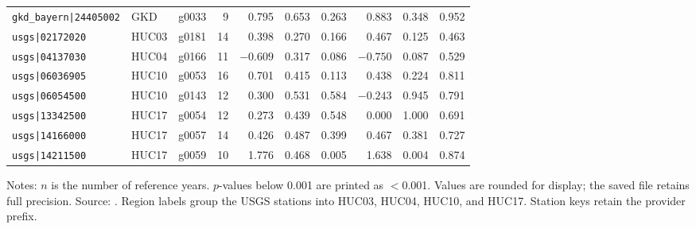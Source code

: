 \begin{table}[p]
{\begin{tabular}{lllrrrrrrr}
\texttt{gkd\_bayern|24405002} & GKD & g0033 & 9 & 0.795 & 0.653 & 0.263 & 0.883 & 0.348 & 0.952 \\
\texttt{usgs|02172020} & HUC03 & g0181 & 14 & 0.398 & 0.270 & 0.166 & 0.467 & 0.125 & 0.463 \\
\texttt{usgs|04137030} & HUC04 & g0166 & 11 & $-0.609$ & 0.317 & 0.086 & $-0.750$ & 0.087 & 0.529 \\
\texttt{usgs|06036905} & HUC10 & g0053 & 16 & 0.701 & 0.415 & 0.113 & 0.438 & 0.224 & 0.811 \\
\texttt{usgs|06054500} & HUC10 & g0143 & 12 & 0.300 & 0.531 & 0.584 & $-0.243$ & 0.945 & 0.791 \\
\texttt{usgs|13342500} & HUC17 & g0054 & 12 & 0.273 & 0.439 & 0.548 & 0.000 & 1.000 & 0.691 \\
\texttt{usgs|14166000} & HUC17 & g0057 & 14 & 0.426 & 0.487 & 0.399 & 0.467 & 0.381 & 0.727 \\
\texttt{usgs|14211500} & HUC17 & g0059 & 10 & 1.776 & 0.468 & 0.005 & 1.638 & 0.004 & 0.874 \\
\bottomrule
\end{tabular}}
\par\smallskip\footnotesize Notes: $n$ is the number of reference years. $p$-values below 0.001 are printed as $<$0.001. Values are rounded for display; the saved file retains full precision. Source: . Region labels group the USGS stations into HUC03, HUC04, HUC10, and HUC17. Station keys retain the provider prefix.
\end{table}
